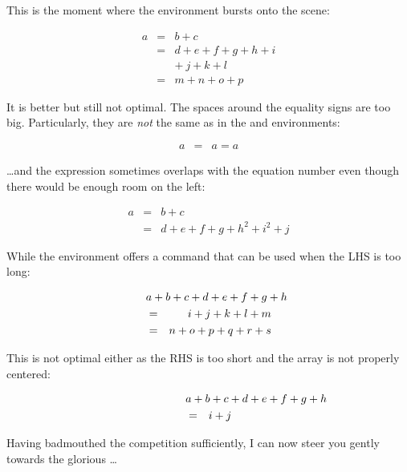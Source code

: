 This is the moment where the  environment bursts onto the scene:
\begin{example}
\begin{eqnarray}
  a & = & b + c \\
  & = & d + e + f
  + g + h + i \nonumber \\
  && +\: j + k + l \\
  & = & m + n + o + p
\end{eqnarray}
\end{example}

It is better but still not optimal. The spaces around the equality signs are too big.
Particularly, they are \emph{not} the same as in the
 and  environments:
\begin{example}
\begin{eqnarray}
  a & = & a = a
\end{eqnarray}
\end{example}

\noindent \ldots and the expression sometimes overlaps with the equation number even
though there would be enough room on the left:
\begin{example}
\begin{eqnarray}
  a & = & b + c 
  \\
  & = & d + e + f + g + h^2 
  + i^2 + j 
  \label{eq:faultyeqnarray}
\end{eqnarray}
\end{example}

\noindent While the environment offers a command  that can
be used when the LHS is too long:
\begin{example}
\begin{eqnarray}
  \lefteqn{a + b + c + d 
    + e + f + g + h}\nonumber\\
  & = & i + j + k + l + m 
  \\
  & = & n + o + p + q + r + s
\end{eqnarray}
\end{example}
\noindent This is not optimal either as the RHS is too short and the array is
not properly centered:
\begin{example}
\begin{eqnarray}
  \lefteqn{a + b + c + d 
    + e + f + g + h} 
  \nonumber \\
  & = & i + j 
\end{eqnarray}
\end{example}

\noindent Having badmouthed the competition sufficiently, I can now steer you gently towards the glorious \ldots

